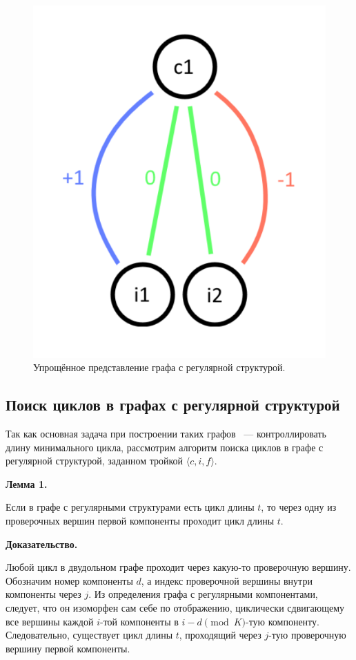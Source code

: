 \documentclass[14pt]{mmcs_article}
\begin{document}
\begin{figure}[H]
  \centering
  \includegraphics[scale=0.4]{Fig_2.png}
  \caption{ Упрощённое представление графа с регулярной структурой. }
  \label{stud:fig:2}
\end{figure}

\subsection{Поиск циклов в графах с регулярной структурой}

Так как основная задача при построении таких графов ~--- контроллировать длину минимального цикла, рассмотрим алгоритм поиска циклов в графе с регулярной структурой, заданном тройкой $\langle c, i, f \rangle$.

\textbf{Лемма 1.}

Если в графе с регулярными структурами есть цикл длины $t$, то через одну из проверочных вершин первой компоненты проходит цикл длины $t$.

\textbf{Доказательство.}

Любой цикл в двудольном графе проходит через какую-то проверочную вершину. Обозначим номер компоненты $d$, а индекс проверочной вершины внутри компоненты через $j$. Из определения графа с регулярными компонентами, следует, что он изоморфен сам себе по отображению, циклически сдвигающему все вершины каждой $i$-той компоненты в $i - d \pmod K$-тую компоненту. Следовательно, существует цикл длины $t$, проходящий через $j$-тую проверочную вершину первой компоненты.
\end{document}
